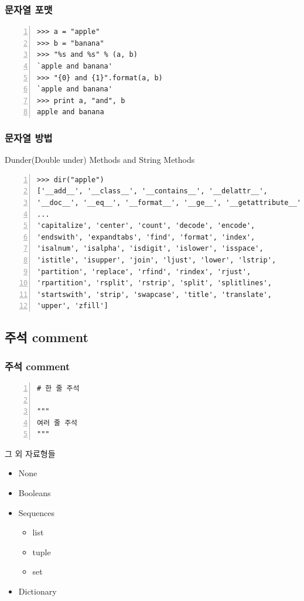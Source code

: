 \documentclass[10pt]{beamer}
\begin{document}
\begin{frame}[fragile]
\frametitle{문자열 포맷}
\begin{Verbatim}[numbers=left,commandchars=\\\{\}]
>>> a = "apple"
>>> b = "banana"
>>> "%s and %s" % (a, b)
`apple and banana'
>>> "{0} and {1}".format(a, b)
`apple and banana'
>>> print a, "and", b
apple and banana
\end{Verbatim}
\end{frame}

\begin{frame}[fragile]
\frametitle{문자열 방법}
Dunder(Double under) Methods and String Methods
\begin{Verbatim}[numbers=left,commandchars=\\\{\}]
>>> dir("apple")
['__add__', '__class__', '__contains__', '__delattr__',
'__doc__', '__eq__', '__format__', '__ge__', '__getattribute__',
...
'capitalize', 'center', 'count', 'decode', 'encode',
'endswith', 'expandtabs', 'find', 'format', 'index',
'isalnum', 'isalpha', 'isdigit', 'islower', 'isspace',
'istitle', 'isupper', 'join', 'ljust', 'lower', 'lstrip',
'partition', 'replace', 'rfind', 'rindex', 'rjust',
'rpartition', 'rsplit', 'rstrip', 'split', 'splitlines',
'startswith', 'strip', 'swapcase', 'title', 'translate',
'upper', 'zfill']
\end{Verbatim}
\end{frame}

\subsection{주석 comment}
\begin{frame}[fragile]
\frametitle{주석 comment}
\begin{Verbatim}[numbers=left,commandchars=\\\{\}]
# 한 줄 주석

"""
여러 줄 주석
"""
\end{Verbatim}
\end{frame}

\begin{frame}{그 외 자료형들}
\begin{itemize}
\item None
\item Booleans
\item Sequences
	\begin{itemize}
		\item list
		\item tuple
		\item set
	\end{itemize}
\item Dictionary
\end{itemize}
\end{frame}
\end{document}
